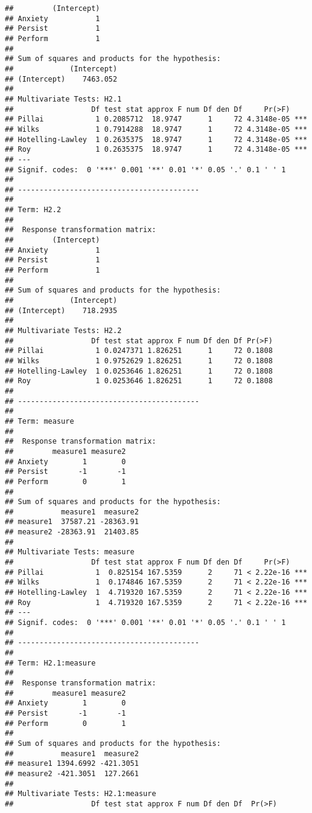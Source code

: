 \documentclass{article}\usepackage[]{graphicx}\usepackage[]{color}
\makeatletter
\newenvironment{kframe}{%
 \def\at@end@of@kframe{}%
 \ifinner\ifhmode%
  \def\at@end@of@kframe{\end{minipage}}%
  \begin{minipage}{\columnwidth}%
 \fi\fi%
 \def\FrameCommand##1{\hskip\@totalleftmargin \hskip-\fboxsep
 \colorbox{shadecolor}{##1}\hskip-\fboxsep
     \hskip-\linewidth \hskip-\@totalleftmargin \hskip\columnwidth}%
 \MakeFramed {\advance\hsize-\width
   \@totalleftmargin\z@ \linewidth\hsize
   \@setminipage}}%
 {\par\unskip\endMakeFramed%
 \at@end@of@kframe}
\newenvironment{knitrout}{}{} %
\makeatother
\begin{document}
\begin{knitrout}
\begin{kframe}
\begin{verbatim}
##         (Intercept)
## Anxiety           1
## Persist           1
## Perform           1
## 
## Sum of squares and products for the hypothesis:
##             (Intercept)
## (Intercept)    7463.052
## 
## Multivariate Tests: H2.1
##                  Df test stat approx F num Df den Df     Pr(>F)    
## Pillai            1 0.2085712  18.9747      1     72 4.3148e-05 ***
## Wilks             1 0.7914288  18.9747      1     72 4.3148e-05 ***
## Hotelling-Lawley  1 0.2635375  18.9747      1     72 4.3148e-05 ***
## Roy               1 0.2635375  18.9747      1     72 4.3148e-05 ***
## ---
## Signif. codes:  0 '***' 0.001 '**' 0.01 '*' 0.05 '.' 0.1 ' ' 1
## 
## ------------------------------------------
##  
## Term: H2.2 
## 
##  Response transformation matrix:
##         (Intercept)
## Anxiety           1
## Persist           1
## Perform           1
## 
## Sum of squares and products for the hypothesis:
##             (Intercept)
## (Intercept)    718.2935
## 
## Multivariate Tests: H2.2
##                  Df test stat approx F num Df den Df Pr(>F)
## Pillai            1 0.0247371 1.826251      1     72 0.1808
## Wilks             1 0.9752629 1.826251      1     72 0.1808
## Hotelling-Lawley  1 0.0253646 1.826251      1     72 0.1808
## Roy               1 0.0253646 1.826251      1     72 0.1808
## 
## ------------------------------------------
##  
## Term: measure 
## 
##  Response transformation matrix:
##         measure1 measure2
## Anxiety        1        0
## Persist       -1       -1
## Perform        0        1
## 
## Sum of squares and products for the hypothesis:
##           measure1  measure2
## measure1  37587.21 -28363.91
## measure2 -28363.91  21403.85
## 
## Multivariate Tests: measure
##                  Df test stat approx F num Df den Df     Pr(>F)    
## Pillai            1  0.825154 167.5359      2     71 < 2.22e-16 ***
## Wilks             1  0.174846 167.5359      2     71 < 2.22e-16 ***
## Hotelling-Lawley  1  4.719320 167.5359      2     71 < 2.22e-16 ***
## Roy               1  4.719320 167.5359      2     71 < 2.22e-16 ***
## ---
## Signif. codes:  0 '***' 0.001 '**' 0.01 '*' 0.05 '.' 0.1 ' ' 1
## 
## ------------------------------------------
##  
## Term: H2.1:measure 
## 
##  Response transformation matrix:
##         measure1 measure2
## Anxiety        1        0
## Persist       -1       -1
## Perform        0        1
## 
## Sum of squares and products for the hypothesis:
##           measure1  measure2
## measure1 1394.6992 -421.3051
## measure2 -421.3051  127.2661
## 
## Multivariate Tests: H2.1:measure
##                  Df test stat approx F num Df den Df  Pr(>F)  

\end{verbatim}
\end{kframe}
\end{knitrout}
\end{document}
